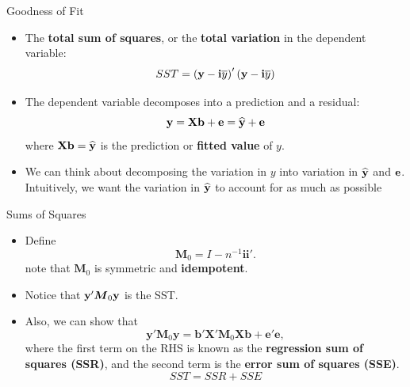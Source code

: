 \documentclass[english,xcolor={dvipsnames},aspectratio=169]{beamer}
\begin{document}
\begin{frame}{Goodness of Fit}
\begin{itemize}
	\item The {\bf total sum of squares}, or the {\bf total variation} in the dependent variable:\[
	SST = \left({\bf y} - {\bf i} \overline{y} \right)' \left({\bf y} - {\bf i} \overline{y} \right)
	\]

	\smallskip
	\item The dependent variable decomposes into a prediction and a residual:\[
	{\bf y} = {\bf X} {\bf b} + {\bf e} =  \widehat{{\bf y}} + {\bf e}
	\]
where ${\bf X} {\bf b} =  \widehat{{\bf y}}$ is the prediction or {\bf fitted value} of $y$. 

	\smallskip
	\item We can think about decomposing the variation in $y$ into variation in $ \widehat{{\bf y}}$ and ${\bf e}$.
	Intuitively, we want the variation in  $ \widehat{{\bf y}}$ to account for as much as possible
\end{itemize}
\end{frame}



\begin{frame}{Sums of Squares}
\begin{itemize}
	\item Define \[
\boldsymbol{M}_{0}=I-n^{-1}\boldsymbol{i}\boldsymbol{i}'.
\]
note that $\boldsymbol{M}_{0}$ is symmetric and {\bf idempotent}.

\smallskip
\item Notice that $ {\bf y}'\boldsymbol{M}_{0}{\bf y}$ is the SST. 

\smallskip
\item Also, we can show that
\[
\boldsymbol{y}'\boldsymbol{M}_{0}\boldsymbol{y}=\boldsymbol{b}'\boldsymbol{X}'\boldsymbol{M}_{0}\boldsymbol{X}\boldsymbol{b}+\boldsymbol{e}'\boldsymbol{e},
\]
where the first term on the RHS is known as the \textbf{regression
sum of squares (SSR)}, and the second term is the \textbf{error sum
of squares (SSE)}.\[
SST = SSR + SSE
\]
	
\end{itemize}
\end{frame}
\end{document}
